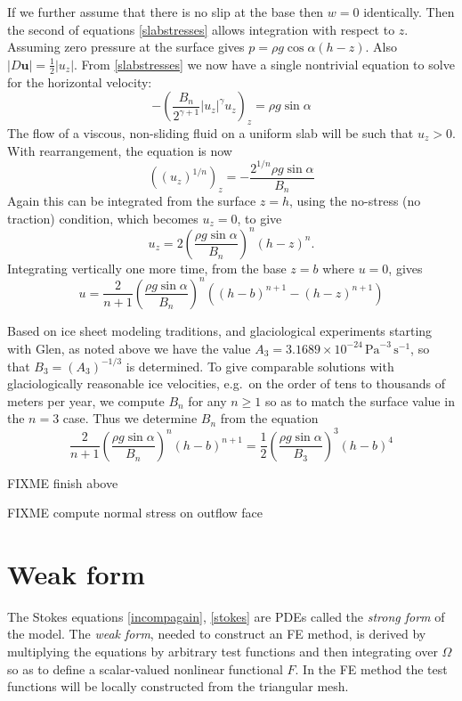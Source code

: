 \documentclass[letterpaper,final,12pt,reqno]{amsart}
\newcommand{\bu}{\mathbf{u}}
\begin{document}
If we further assume that there is no slip at the base then $w=0$ identically.  Then the second of equations \eqref{slabstresses} allows integration with respect to $z$.  Assuming zero pressure at the surface gives $p = \rho g\cos\alpha (h-z)$.  Also $|D\bu| = \frac{1}{2} |u_z|$.  From \eqref{slabstresses} we now have a single nontrivial equation to solve for the horizontal velocity:
    $$- \left(\frac{B_n}{2^{\gamma+1}} |u_z|^\gamma u_z\right)_z = \rho g\sin\alpha$$
The flow of a viscous, non-sliding fluid on a uniform slab will be such that $u_z>0$.  With rearrangement, the equation is now
    $$\left((u_z)^{1/n} \right)_z = - \frac{2^{1/n} \rho g\sin\alpha}{B_n}$$
Again this can be integrated from the surface $z=h$, using the no-stress (no traction) condition, which becomes $u_z=0$, to give
    $$u_z = 2 \left(\frac{\rho g\sin\alpha}{B_n}\right)^n (h-z)^n.$$
Integrating vertically one more time, from the base $z=b$ where $u=0$, gives
    $$u = \frac{2}{n+1} \left(\frac{\rho g\sin\alpha}{B_n}\right)^n \left((h-b)^{n+1} - (h-z)^{n+1}\right)$$

Based on ice sheet modeling traditions, and glaciological experiments starting with Glen, as noted above we have the value $A_3 = 3.1689 \times 10^{-24} \,\text{Pa}^{-3}\,\text{s}^{-1}$, so that $B_3 = (A_3)^{-1/3}$ is determined.  To give comparable solutions with glaciologically reasonable ice velocities, e.g.~on the order of tens to thousands of meters per year, we compute $B_n$ for any $n\ge 1$ so as to match the surface value in the $n=3$ case.  Thus we determine $B_n$ from the equation
    $$\frac{2}{n+1} \left(\frac{\rho g\sin\alpha}{B_n}\right)^n (h-b)^{n+1} = \frac{1}{2} \left(\frac{\rho g\sin\alpha}{B_3}\right)^3 (h-b)^4$$

FIXME finish above

FIXME compute normal stress on outflow face


\section{Weak form}

The Stokes equations \eqref{incompagain}, \eqref{stokes} are PDEs called the \emph{strong form} of the model.  The \emph{weak form}, needed to construct an FE method, is derived by multiplying the equations by arbitrary test functions and then integrating over $\Omega$ so as to define a scalar-valued nonlinear functional $F$.  In the FE method the test functions will be locally constructed from the triangular mesh.
\end{document}
